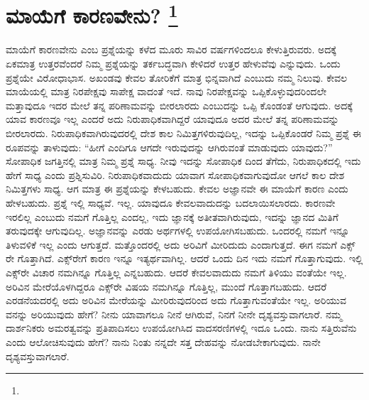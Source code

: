 
\chapter[ಮಾಯೆಗೆ ಕಾರಣವೇನು? ]{ಮಾಯೆಗೆ ಕಾರಣವೇನು? \protect\footnote{}}

ಮಾಯೆಗೆ ಕಾರಣವೇನು ಎಂಬ ಪ್ರಶ್ನೆಯನ್ನು ಕಳೆದ ಮೂರು ಸಾವಿರ ವರ್ಷಗಳಿಂದಲೂ ಕೇಳುತ್ತಿರುವರು. ಅದಕ್ಕೆ ಏಕಮಾತ್ರ ಉತ್ತರವೆಂದರೆ ನಿಮ್ಮ ಪ್ರಶ್ನೆಯನ್ನು ತರ್ಕಬದ್ಧವಾಗಿ ಕೇಳಿದರೆ ಉತ್ತರ ಹೇಳುವೆವು ಎನ್ನುವುದು. ಒಂದು ಪ್ರಶ್ನೆಯೇ ವಿರೋಧಾಭಾಸ. ಅಖಂಡವು ಕೇವಲ ತೋರಿಕೆಗೆ ಮಾತ್ರ ಭಿನ್ನವಾಗಿದೆ ಎಂಬುದು ನಮ್ಮ ನಿಲುವು. ಕೇವಲ ಮಾಯೆಯಲ್ಲಿ ಮಾತ್ರ ನಿರಪೇಕ್ಷವು ಸಾಪೇಕ್ಷ ವಾದಂತೆ ಇದೆ. ನಾವು ನಿರಪೇಕ್ಷವನ್ನು ಒಪ್ಪಿಕೊಳ್ಳುವುದರಿಂದಲೇ ಮತ್ತಾವುದೂ ಇದರ ಮೇಲೆ ತನ್ನ ಪರಿಣಾಮವನ್ನು ಬೀರಲಾರದು ಎಂಬುದನ್ನು ಒಪ್ಪಿ ಕೊಂಡಂತೆ ಆಗುವುದು. ಅದಕ್ಕೆ ಯಾವ ಕಾರಣವೂ ಇಲ್ಲ ಎಂದರೆ ಅದು ನಿರುಪಾಧಿಕವಾಗಿದ್ದರೆ ಯಾವುದೂ ಅದರ ಮೇಲೆ ತನ್ನ ಪರಿಣಾಮವನ್ನು ಬೀರಲಾರದು. ನಿರುಪಾಧಿಕವಾಗಿರುವುದರಲ್ಲಿ ದೇಶ ಕಾಲ ನಿಮಿತ್ತಗಳಿರುವುದಿಲ್ಲ, ಇದನ್ನು ಒಪ್ಪಿಕೊಂಡರೆ ನಿಮ್ಮ ಪ್ರಶ್ನೆ ಈ ರೂಪವನ್ನು ತಾಳುವುದು: “ಹೀಗೆ ಎಂದಿಗೂ ಆಗದೇ ಇರುವುದನ್ನು ಆಗಿರುವಂತೆ ಮಾಡುವುದು ಯಾವುದು?” ಸೋಪಾಧಿಕ ಜಗತ್ತಿನಲ್ಲಿ ಮಾತ್ರ ನಿಮ್ಮ ಪ್ರಶ್ನೆ ಸಾಧ್ಯ. ನೀವು ಇದನ್ನು ಸೋಪಾಧಿಕ ದಿಂದ ತೆಗೆದು, ನಿರುಪಾಧಿಕದಲ್ಲಿ ಇದು ಹೇಗೆ ಸಾಧ್ಯ ಎಂದು ಪ್ರಶ್ನಿಸುವಿರಿ. ನಿರುಪಾಧಿಕವಾದುದು ಯಾವಾಗ ಸೋಪಾಧಿಕವಾಗುವುದೋ ಆಗಲೆ ಕಾಲ ದೇಶ ನಿಮಿತ್ತಗಳು ಸಾಧ್ಯ. ಆಗ ಮಾತ್ರ ಈ ಪ್ರಶ್ನೆಯನ್ನು ಕೇಳಬಹುದು. ಕೇವಲ ಅಜ್ಞಾನವೇ ಈ ಮಾಯೆಗೆ ಕಾರಣ ಎಂದು ಹೇಳಬಹುದು. ಪ್ರಶ್ನೆ ಇಲ್ಲಿ ಸಾಧ್ಯವೆ. ಇಲ್ಲ. ಯಾವುದೂ ಕೇವಲವಾದುದನ್ನು ಬದಲಾಯಿಸಲಾರದು. ಕಾರಣವೇ ಇರಲಿಲ್ಲ ಎಂಬುದು ನಮಗೆ ಗೊತ್ತಿಲ್ಲ ಎಂದಲ್ಲ, ಇದು ಜ್ಞಾನಕ್ಕೆ ಅತೀತವಾಗಿರುವುದು, ಇದನ್ನು ಜ್ಞಾನದ ಮಿತಿಗೆ ತರುವುದಕ್ಕೇ ಆಗುವುದಿಲ್ಲ. ಅಜ್ಞಾನವನ್ನು ಎರಡು ಅರ್ಥಗಳಲ್ಲಿ ಉಪಯೋಗಿಸಬಹುದು. ಒಂದರಲ್ಲಿ ನಮಗೆ ಇನ್ನೂ ತಿಳುವಳಿಕೆ ಇಲ್ಲ ಎಂದು ಆಗುತ್ತದೆ. ಮತ್ತೊಂದರಲ್ಲಿ ಅದು ಅರಿವಿಗೆ ಮೀರಿದುದು ಎಂದಾಗುತ್ತದೆ. ಈಗ ನಮಗೆ ಎಕ್ಸ್​ರೇ ಗೊತ್ತಾಗಿದೆ. ಎಕ್ಸ್​ರೇಗೆ ಕಾರಣ ಇನ್ನೂ ಇತ್ಯರ್ಥವಾಗಿಲ್ಲ. ಆದರೆ ಒಂದು ದಿನ ಇದು ನಮಗೆ ಗೊತ್ತಾಗುವುದು. ಇಲ್ಲಿ ಎಕ್ಸ್​ರೇ ವಿಚಾರ ನಮಗಿನ್ನೂ ಗೊತ್ತಿಲ್ಲ ಎನ್ನಬಹುದು. ಆದರೆ ಕೇವಲವಾದುದು ನಮಗೆ ತಿಳಿಯು ವಂತೆಯೇ ಇಲ್ಲ. ಅರಿವಿನ ಮೇರೆಯೊಳಗಿದ್ದರೂ ಎಕ್ಸ್​ರೇ ವಿಷಯ ನಮಗಿನ್ನೂ ಗೊತ್ತಿಲ್ಲ, ಮುಂದೆ ಗೊತ್ತಾಗಬಹುದು. ಆದರೆ ಎರಡನೆಯದರಲ್ಲಿ ಅದು ಅರಿವಿನ ಮೇರೆಯನ್ನು ಮೀರಿರುವುದರಿಂದ ಅದು ಗೊತ್ತಾಗುವಂತೆಯೇ ಇಲ್ಲ. ಅರಿಯುವ ವನನ್ನು ಅರಿಯುವುದು ಹೇಗೆ? ನೀನು ಯಾವಾಗಲೂ ನೀನೆ ಆಗಿರುವೆ, ನಿನಗೆ ನೀನೇ ದೃಶ್ಯವಸ್ತುವಾಗಲಾರೆ. ನಮ್ಮ ದಾರ್ಶನಿಕರು ಅಮರತ್ವವನ್ನು ಪ್ರತಿಪಾದಿಸಲು ಉಪಯೋಗಿಸಿದ ವಾದಸರಣಿಗಳಲ್ಲಿ ಇದೂ ಒಂದು. ನಾನು ಸತ್ತಿರುವೆನು ಎಂದು ಆಲೋಚಿಸುವುದು ಹೇಗೆ? ನಾನು ನಿಂತು ನನ್ನದೇ ಸತ್ತ ದೇಹವನ್ನು ನೋಡಬೇಕಾಗುವುದು. ನಾನೇ ದೃಶ್ಯವಸ್ತುವಾಗಲಾರೆ.


